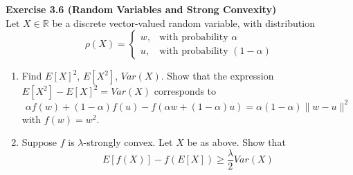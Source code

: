 \documentclass[
	10pt, %
	a4paper, %
	oneside, %
	headinclude,footinclude, %
	BCOR5mm, %
]{scrartcl}
\newenvironment{problem}[2][]
{ \begin{mdframed}[backgroundcolor=gray!20] \textbf{#1 #2} \\}
		{  \end{mdframed}}
\begin{document}
\begin{problem}{Exercise 3.6 (Random Variables and Strong Convexity)}
Let $X \in \mathbb{R}$ be a discrete vector-valued random variable, with distribution
\[
	\rho(X) =
	\begin{cases}
		w, & \text{with probability }\alpha       \\
		u, & \text{with probability }(1 - \alpha)
	\end{cases}
\]
\begin{enumerate}
	\item Find ${E[X]}^2$, $E[X^2]$, $Var(X)$. Show that the expression $E[X^2] - {E[X]}^2 = Var(X)$ corresponds to
	      \[
		      \alpha f(w) + (1 - \alpha) f(u) - f(\alpha w + (1 - \alpha) u) = \alpha (1 - \alpha) \|w - u\|^2
	      \]
	      with $f(w) = w^2$.

	\item Suppose $f$ is $\lambda$-strongly convex. Let $X$ be as above. Show that
	      \[
		      E[f(X)] - f(E[X]) \geq \frac{\lambda}{2} Var(X)
	      \]
\end{enumerate}
\end{problem}
\end{document}

